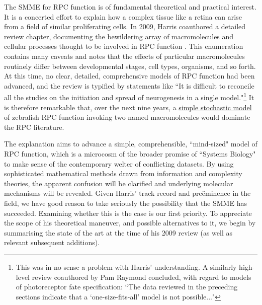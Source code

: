 The SMME for RPC function is of fundamental theoretical and practical interest. It is a concerted effort to explain how a complex tissue like a retina can arise from a field of similar proliferating cells. In 2009, Harris coauthored a detailed review chapter, documenting the bewildering array of macromolecules and cellular processes thought to be involved in RPC function \cite{Agathocleous2009}. This enumeration contains many caveats and notes that the effects of particular macromolecules routinely differ between developmental stages, cell types, organisms, and so forth. At this time, no clear, detailed, comprehensive models of RPC function had been advanced, and the review is typified by statements like ``It is difficult to reconcile all the studies on the initiation and spread of neurogenesis in a single model."\footnote{This was in no sense a problem with Harris' understanding. A similarly high-level review coauthored by Pam Raymond \cite{Adler2008} concluded, with regard to models of photoreceptor fate specification: ``The data reviewed in the preceding sections indicate that a ‘one-size-fits-all’ model is not possible..."} It is therefore remarkable that, over the next nine years, a \hyperref[SSM]{simple stochastic model} of zebrafish RPC function invoking two named macromolecules would dominate the RPC literature.

The explanation aims to advance a simple, comprehensible, ``mind-sized" model of RPC function, which is a microcosm of the broader promise of ``Systems Biology" to make sense of the contemporary welter of conflicting datasets. By using sophisticated mathematical methods drawn from information and complexity theories, the apparent confusion will be clarified and underlying molecular mechanisms will be revealed. Given Harris' track record and pre\"{e}minence in the field, we have good reason to take seriously the possibility that the SMME has succeeded. Examining whether this is the case is our first priority. To appreciate the scope of his theoretical maneuver, and possible alternatives to it, we begin by summarising the state of the art at the time of his 2009 review (as well as relevant subsequent additions).

